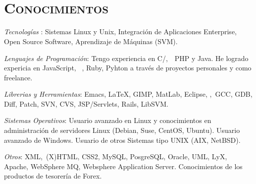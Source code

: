 \begin{resume}
 \begin{formatb}
   \\
   \body\\
 \end{formatb}



\section{\textsc{Conocimientos}}

\emph{Tecnolog\'{i}as }: Sistemas Linux y Unix, Integraci\'{o}n de
Aplicaciones Enterprise, Open Source Software, Aprendizaje de
M\'{a}quinas (SVM).


\emph{Lenguajes de Programaci\'{o}n}: Tengo experiencia en
C/\Cplusplus,\ \ PHP y Java. He logrado expericia en
JavaScript, \ \CSharp, Ruby, Pyhton a trav\'{e}s de proyectos
personales y como freelance.

\emph{Librerias y Herramientas}: Emacs, \LaTeX, GIMP, MatLab, Eclipse, \GTKSharp,\ GCC, GDB, Diff, Patch, SVN, CVS, JSP/Servlets, Rails, LibSVM.

\emph{Sistemas Operativos}: Usuario avanzado en Linux  y conocimientos en
administraci\'{o}n de servidores Linux (Debian, Suse, CentOS, Ubuntu). Usuario avanzado de Windows. Usuario de
otros Sistemas tipo UNIX (AIX, NetBSD).

\emph{Otros}: XML,\ (X)HTML, CSS2, MySQL, PosgreSQL, Oracle,
UML, LyX, Apache, WebSphere MQ, Websphere Application
Server. Conocimientos de los  productos de tesorer\'{i}a de Forex.



\end{resume}
